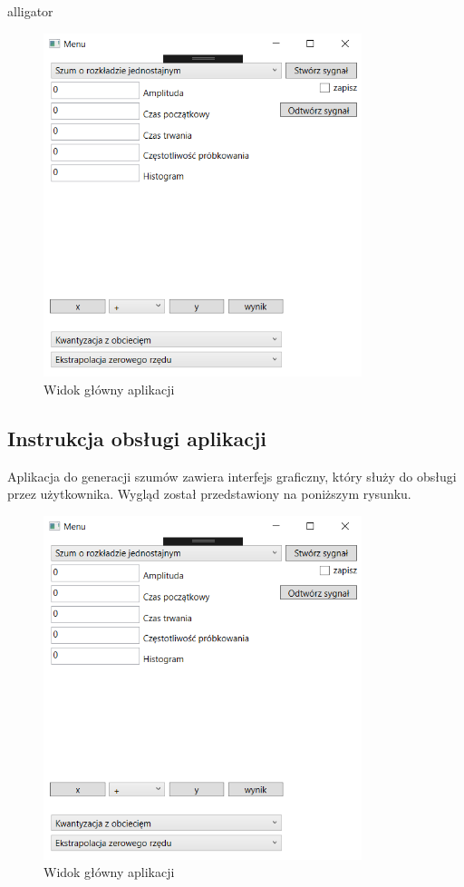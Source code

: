 \documentclass[12pt]{article}
\begin{document}
\begin{labeling}{alligator}
\begin{figure}[h!]
 \includegraphics[width=9.3cm]{ui1.PNG}
 \vspace{-0.3cm}
 \caption{Widok główny aplikacji}
 \label{Widok_aplikacjis}
\end{figure}

\end{labeling}


\subsection{Instrukcja obsługi aplikacji}
Aplikacja do generacji szumów zawiera interfejs graficzny, który służy do obsługi przez użytkownika. Wygląd został przedstawiony na poniższym rysunku.
\newpage
\begin{figure}[h!]
 \centering
 \includegraphics[width=9.3cm]{ui1.PNG}
 \vspace{-0.3cm}
 \caption{Widok główny aplikacji}
 \label{Widok_aplikacjis}
\end{figure}
\end{document}

